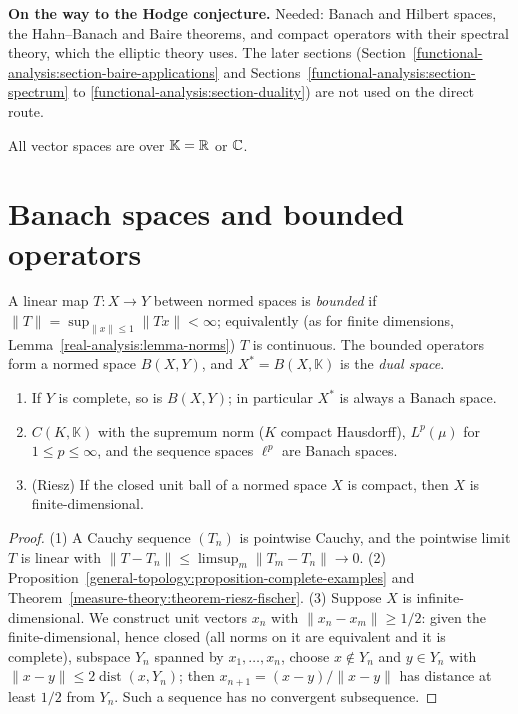 \noindent\textbf{On the way to the Hodge conjecture.} Needed: Banach and Hilbert spaces, the Hahn--Banach and Baire theorems, and compact operators with their spectral theory, which the elliptic
theory uses. The later sections (Section~\ref{functional-analysis:section-baire-applications} and Sections~\ref{functional-analysis:section-spectrum} to \ref{functional-analysis:section-duality}) are not used on the direct route.

All vector spaces are over $\mathbb{K} = \mathbb{R}$ or $\mathbb{C}$.

\section{Banach spaces and bounded operators}\label{functional-analysis:section-banach}

\begin{definition}\label{functional-analysis:definition-bounded-operator}
A linear map $T \colon X \to Y$ between normed spaces is \emph{bounded} if $\|T\| = \sup_{\|x\| \leq 1}\|Tx\| < \infty$; equivalently (as for finite dimensions,
Lemma~\ref{real-analysis:lemma-norms}) $T$ is continuous. The bounded operators form a normed space $B(X, Y)$, and $X^* = B(X, \mathbb{K})$ is the \emph{dual space}.
\end{definition}

\begin{proposition}\label{functional-analysis:proposition-banach-examples}
\begin{enumerate}
\item If $Y$ is complete, so is $B(X, Y)$; in particular $X^*$ is always a Banach space.
\item $C(K, \mathbb{K})$ with the supremum norm ($K$ compact Hausdorff), $L^p(\mu)$ for $1 \leq p \leq \infty$, and the sequence spaces $\ell^p$ are Banach spaces.
\item (Riesz) If the closed unit ball of a normed space $X$ is compact, then $X$ is finite-dimensional.
\end{enumerate}
\end{proposition}

\begin{proof}
(1) A Cauchy sequence $(T_n)$ is pointwise Cauchy, and the pointwise limit $T$ is linear with $\|T - T_n\| \leq \limsup_m\|T_m - T_n\| \to 0$. (2)
Proposition~\ref{general-topology:proposition-complete-examples} and Theorem~\ref{measure-theory:theorem-riesz-fischer}. (3) Suppose $X$ is infinite-dimensional. We construct unit vectors $x_n$ with
$\|x_n - x_m\| \geq 1/2$: given the finite-dimensional, hence closed (all norms on it are equivalent and it is complete), subspace $Y_n$ spanned by $x_1, \ldots, x_n$, choose $x \notin Y_n$ and $y \in Y_n$ with
$\|x - y\| \leq 2\operatorname{dist}(x, Y_n)$; then $x_{n+1} = (x - y)/\|x - y\|$ has distance at least $1/2$ from $Y_n$. Such a sequence has no convergent subsequence.
\end{proof}

